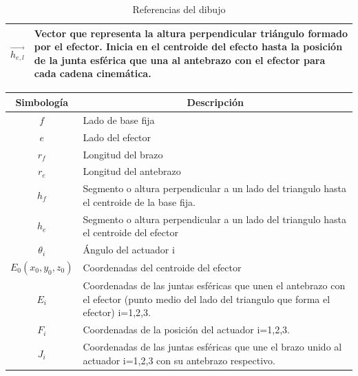 \begin{table}[H]
\begin{tabular}{>{\centering\arraybackslash}m{2cm} >{\arraybackslash}m{5cm} }
              $\overrightarrow{h_{e,l}}$  & Vector que representa la altura perpendicular triángulo formado por el efector. Inicia en el centroide del efecto hasta la posición de la junta esférica que una al antebrazo con el efector para cada cadena cinemática.    \\\hline
            \end{tabular}
            \caption{Referencias del dibujo}
            \label{tab:Anexo_B_my_label}
        \end{table}
        
            \begingroup
            \renewcommand{\arraystretch}{1.5}
            \begin{table}[H]
            \centering
            \begin{tabular}{|c|m{12cm}|}
               \hline
               \textbf{Simbología}  & \multicolumn{1}{c|}{\textbf{Descripción}}  \\\hline
               $f$  & Lado de base fija                                         \\\hline
               $e$  & Lado del efector                                          \\\hline
               $r_{f}$  & Longitud del brazo                                    \\\hline
               $r_{e}$  & Longitud del antebrazo                                \\\hline
               $h_{f}$  & Segmento o altura perpendicular a un lado del triangulo hasta el centroide de la base fija.     \\\hline
               $h_{e}$  & Segmento o altura perpendicular a un lado del triangulo hasta el centroide del efector         \\\hline
               $\theta_{i}$  & Ángulo del actuador i    \\\hline
               $E_{0}(x_{0},y_{0},z_{0})$  & Coordenadas del centroide del efector   \\\hline
               $E_{i}$  & Coordenadas de las juntas esféricas que unen el antebrazo con el efector (punto medio del lado
               del triangulo que forma el efector) i=1,2,3.    \\\hline
               $F_{i}$  & Coordenadas de la posición del actuador i=1,2,3.    \\\hline
               $J_{i}$  & Coordenadas de las juntas esféricas que une el brazo unido al actuador i=1,2,3 con su antebrazo respectivo.    \\\hline

\end{tabular}
\end{table}
